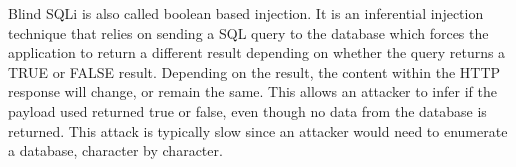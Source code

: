 \documentclass[]{subfiles}
\begin{document}

Blind SQLi is also called boolean based injection. It is an inferential injection
technique that relies on sending a SQL query to the database which forces the
application to return a different result depending on whether the query returns a TRUE
or FALSE result. Depending on the result, the content within the HTTP response will
change, or remain the same. This allows an attacker to infer if the payload used
returned true or false, even though no data from the database is returned. This attack
is typically slow since an attacker would need to enumerate a database, character by
character.

\end{document}
